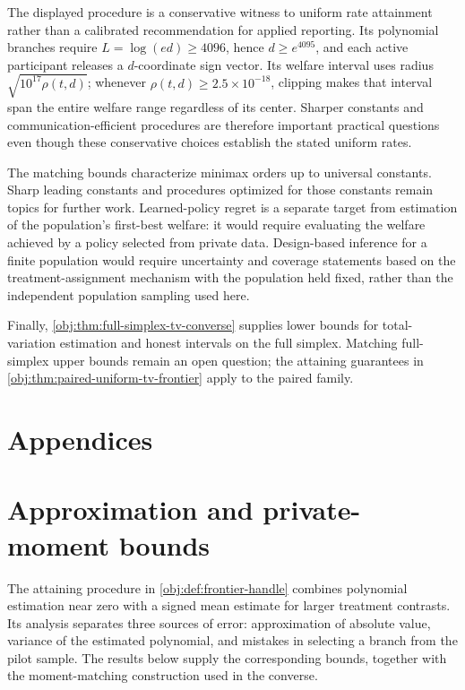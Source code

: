 \documentclass[11pt]{article}
\begin{document}
The displayed procedure is a conservative witness to uniform rate attainment rather than a calibrated recommendation for applied reporting. Its polynomial branches require \(L=\log(ed)\ge4096\), hence \(d\ge e^{4095}\), and each active participant releases a \(d\)-coordinate sign vector. Its welfare interval uses radius \(\sqrt{10^{17}\rho(t,d)}\); whenever \(\rho(t,d)\ge2.5\times10^{-18}\), clipping makes that interval span the entire welfare range regardless of its center. Sharper constants and communication-efficient procedures are therefore important practical questions even though these conservative choices establish the stated uniform rates.

The matching bounds characterize minimax orders up to universal constants. Sharp leading constants and procedures optimized for those constants remain topics for further work. Learned-policy regret is a separate target from estimation of the population's first-best welfare: it would require evaluating the welfare achieved by a policy selected from private data. Design-based inference for a finite population would require uncertainty and coverage statements based on the treatment-assignment mechanism with the population held fixed, rather than the independent population sampling used here.

Finally, \cref{obj:thm:full-simplex-tv-converse} supplies lower bounds for total-variation estimation and honest intervals on the full simplex. Matching full-simplex upper bounds remain an open question; the attaining guarantees in \cref{obj:thm:paired-uniform-tv-frontier} apply to the paired family.


\appendix

\section*{Appendices}

\section{Approximation and private-moment bounds}

The attaining procedure in \cref{obj:def:frontier-handle} combines polynomial estimation near zero with a signed mean estimate for larger treatment contrasts. Its analysis separates three sources of error: approximation of absolute value, variance of the estimated polynomial, and mistakes in selecting a branch from the pilot sample. The results below supply the corresponding bounds, together with the moment-matching construction used in the converse.
\end{document}
